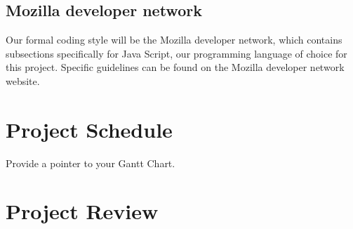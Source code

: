 \documentclass{article}
\begin{document}
\subsection{Mozilla developer network}

Our formal coding style will be the Mozilla developer network, which contains subsections specifically for Java Script, our programming language of choice for this project. Specific guidelines can be found on the Mozilla developer network website.

\section{Project Schedule}

Provide a pointer to your Gantt Chart.

\section{Project Review}
\end{document}

